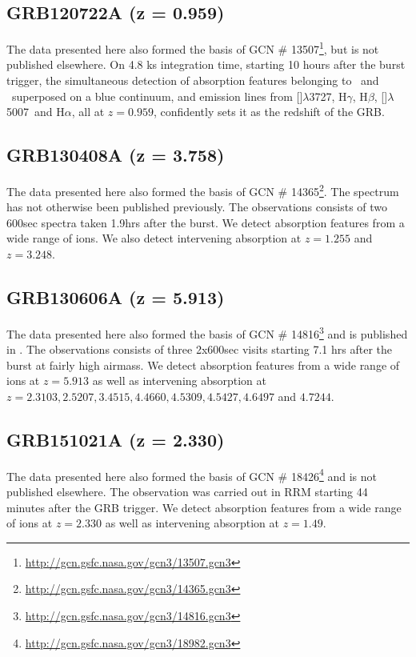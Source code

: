 \documentclass[iop, twocolappendix, numberedappendix, tighten, appendixfloats]{emulateapj}
\newcommand{\hb}{H$\beta$}
\newcommand{\ha}{H$\alpha$}
\newcommand{\hg}{H$\gamma$}
\newcommand{\oii}{[\ion{O}{2}]$\lambda$3727}
\newcommand{\oiii}{[\ion{O}{3}]$\lambda$5007}
\newcommand{\feii}{\ion{Fe}{2}}
\newcommand{\mgii}{\ion{Mg}{2}}
\begin{document}
	
	\subsection{GRB120722A (z = 0.959)}
	The data presented here also formed the basis of GCN \#
	13507\footnote{\url{http://gcn.gsfc.nasa.gov/gcn3/13507.gcn3}}, but is not
	published elsewhere. On 4.8 ks integration time, starting 10 hours after the
	burst trigger, the simultaneous detection of absorption features belonging to
	\mgii~and \feii~superposed on a blue continuum, and emission lines from \oii,
	\hg, \hb, \oiii~and \ha, all at $z = 0.959$, confidently sets it as the
	redshift of the GRB.
	
	
    \subsection{GRB130408A (z = 3.758)}
	The data presented here also formed the basis of GCN \#
	14365\footnote{\url{http://gcn.gsfc.nasa.gov/gcn3/14365.gcn3}}. The spectrum
	has not otherwise been published previously. The observations consists of two
	600sec spectra taken 1.9hrs after the burst. We detect absorption features from
	a wide range of ions. We also detect intervening absorption at $z=1.255$ and
	$z=3.248$.
	
	\subsection{GRB130606A (z = 5.913)}
	The data presented here also formed the basis of GCN \#
	14816\footnote{\url{http://gcn.gsfc.nasa.gov/gcn3/14816.gcn3}} and is published
	in \citet{Hartoog2015}. The observations consists of three 2x600sec visits
	starting 7.1 hrs after the burst at fairly high airmass. We detect absorption
	features from a wide range of ions at $z=5.913$ as well as intervening
	absorption at $z=2.3103, 2.5207, 3.4515, 4.4660, 4.5309, 4.5427, 4.6497 $ and $
	4.7244$.

	\subsection{GRB151021A (z = 2.330)}
	The data presented here also formed the basis of GCN \#
	18426\footnote{\url{http://gcn.gsfc.nasa.gov/gcn3/18982.gcn3}} and is not
	published elsewhere. The observation was carried out in RRM starting 44 minutes
	after the GRB trigger. We detect absorption features from a wide range of ions
	at $z=2.330$ as well as intervening absorption at $z=1.49$.
\end{document}
